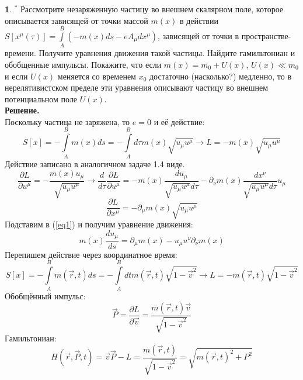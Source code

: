\documentclass[12pt]{article}
\theoremstyle{definition}
\newtheorem{zad}{}[section]
\begin{document}
\begin{zad}
\textbf{$^*$} Рассмотрите незаряженную частицу во внешнем скалярном поле, которое описывается зависящей от точки массой $m(x)$ в действии $S[x^\mu(\tau)]=\int\limits_A^B(-m(x)ds-eA_\mu dx^\mu)$, зависящей от точки в пространстве-времени. Получите уравнения движения такой частицы. Найдите гамильтониан и обобщенные импульсы. Покажите, что если $m(x) = m_0 + U(x)$, $U(x)\ll m_0$ и если $U(x)$ меняется со временем $x_0$ достаточно (насколько?) медленно, то в нерелятивистском пределе эти уравнения описывают частицу во внешнем потенциальном поле $U(x)$.\\
\textbf{Решение.}\\
Поскольку частица не заряжена, то $e=0$ и её действие:
\begin{equation}
    S[x]=-\int\limits_A^Bm(x)ds=-\int\limits_A^Bd\tau m(x)\sqrt{u_\mu u^\mu}\rightarrow L=-m(x)\sqrt{u_\mu u^\mu}
\end{equation}
Действие записано в аналогичном задаче 1.4 виде.
\begin{equation}
    \frac{\partial L}{\partial u^\mu}=-\frac{m(x)u_\mu}{\sqrt{u_\mu u^\mu}}\rightarrow\frac{d}{d\tau}\frac{\partial L}{\partial u^\mu}=-m(x)\frac{du_\mu}{\sqrt{u_\mu u^\mu}d\tau}-\partial_\nu m(x)\frac{dx^\nu}{\sqrt{u_\mu u^\mu}d\tau}u_\mu
\end{equation}
\begin{equation}
    \frac{\partial L}{\partial x^\mu}=-\partial_\mu m(x)\sqrt{u_\mu u^\mu}
\end{equation}
Подставим в (\ref{eq1}) и получим уравнение движения:
\begin{equation}\label{eq2}
    \boxed{m(x)\frac{du_\mu}{ds}=\partial_\mu m(x)-u_\mu u^\nu\partial_\nu m(x)}
\end{equation}
Перепишем действие через координатное время:
\begin{equation}
    S[x]=-\int\limits_A^Bm(\vec{r},t)ds=-\int\limits_A^Bdt m(\vec{r},t)\sqrt{1-\vec{v}^2}\rightarrow L=-m(\vec{r},t)\sqrt{1-\vec{v}^2}
\end{equation}
Обобщённый импульс:
\begin{equation}
    \boxed{\vec{P}=\frac{\partial L}{\partial\vec{v}}=\frac{m(\vec{r},t)\vec{v}}{\sqrt{1-\vec{v}^2}}}
\end{equation}
Гамильтониан:
\begin{equation}
    \boxed{H(\vec{r},\vec{P},t)=\vec{v}\vec{P}-L=\frac{m(\vec{r},t)}{\sqrt{1-\vec{v}^2}}=\sqrt{m(\vec{r},t)^2+P^2}}
\end{equation}

\end{zad}
\end{document}
